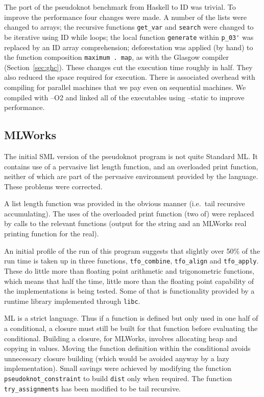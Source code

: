 The port of the pseudoknot benchmark from Haskell to ID was trivial.
To improve the performance four changes were made. A number of the
lists were changed to arrays; the recursive functions \verb=get_var=
and \verb=search= were changed to be iterative using ID while loops;
the local function \verb=generate= within \verb=p_03'= was replaced by
an ID array comprehension; deforestation was applied (by hand) to the
function composition \verb=maximum . map=, as with the Glasgow
compiler (Section~\ref{sec:ghc}). These changes cut the execution
time roughly in half. They also reduced the space required for
execution. There is associated overhead with compiling for parallel
machines that we pay even on sequential machines. We compiled with
--O2 and linked all of the executables using --static to improve
performance.


\subsection{MLWorks}
The initial SML version of the pseudoknot program is not quite
Standard ML. It contains use of a pervasive list length function, and
an overloaded print function, neither of which are part of the
pervasive environment provided by the language. These problems were
corrected.

A list length function was provided in the obvious manner (i.e.\ tail
recursive accumulating). The uses of the overloaded print function
(two of) were replaced by calls to the relevant functions (output for
the string and an MLWorks real printing function for the real).

An initial profile of the run of this program suggests that slightly
over 50\% of the run time is taken up in three functions,
\verb=tfo_combine=, \verb=tfo_align= and \verb=tfo_apply=. These do
little more than floating point arithmetic and trigonometric functions,
which means that half the time, little more than the floating point
capability of the implementations is being tested. Some of that is
functionality provided by a runtime library implemented through
\verb=libc=.

ML is a strict language. Thus if a function is defined but only used in
one half of a conditional, a closure must still be built for that
function before evaluating the conditional. Building a closure, for
MLWorks, involves allocating heap and copying in values. Moving the
function definition within the conditional avoids unnecessary closure
building (which would be avoided anyway by a lazy implementation).
Small savings were achieved by modifying the function
\verb=pseudoknot_constraint= to build \verb=dist= only when required.
The function \verb=try_assignments= has been modified to be tail
recursive.


